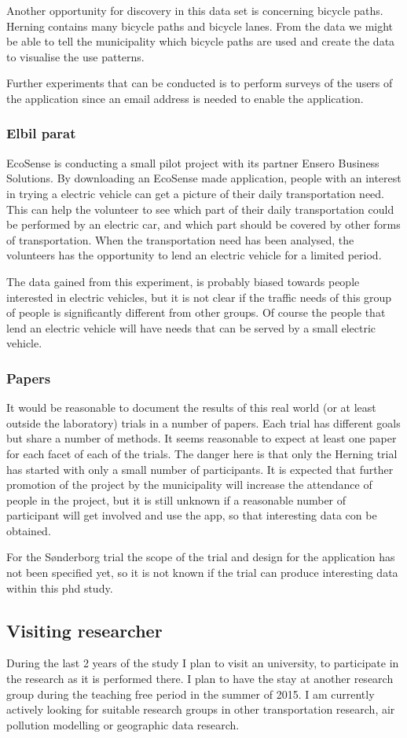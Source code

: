 Another opportunity for discovery in this data set is concerning bicycle paths. Herning contains many bicycle paths and bicycle lanes. From the data we might be able to tell the municipality which bicycle paths are used and create the data to visualise the use patterns.

Further experiments that can be conducted is to perform surveys of the users of the application since an email address is needed to enable the application.

\subsubsection{Elbil parat}

EcoSense is conducting a small pilot project with its partner Ensero Business Solutions. By downloading an EcoSense made application, people with an interest in trying a electric vehicle can get a picture of their daily transportation need. This can help the volunteer to see which part of their daily transportation could be performed by an electric car, and which part should be covered by other forms of transportation. When the transportation need has been analysed, the volunteers has the opportunity to lend an electric vehicle for a limited period.

The data gained from this experiment, is probably biased towards people interested in electric vehicles, but it is not clear if the traffic needs of this group of people is significantly different from other groups. Of course the people that lend an electric vehicle will have needs that can be served by a small electric vehicle.


\subsubsection{Papers}
It would be reasonable to document the results of this real world (or at least outside the laboratory) trials in a number of papers. Each trial has different goals but share a number of methods. It seems reasonable to expect at least one paper for each facet of each of the trials. The danger here is that only the Herning trial has started with only a small number of participants. It is expected that further promotion of the project by the municipality will increase the attendance of people in the project, but it is still unknown if a reasonable number of participant will get involved and use the app, so that interesting data con be obtained.

For the S\o nderborg trial the scope of the trial and design for the application has not been specified yet, so it is not known if the trial can produce interesting data within this phd study.


\subsection{Visiting researcher}
During the last 2 years of the study I plan to visit an university, to participate in the research as it is performed there. I plan to have the stay at another research group during the teaching free period in the summer of 2015. I am currently actively looking for suitable research groups in other transportation research, air pollution modelling or geographic data research.
